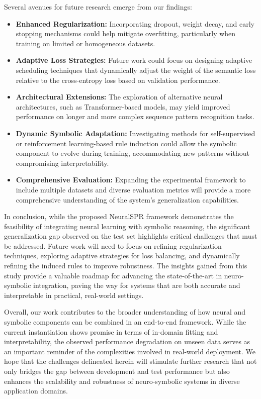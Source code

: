 \documentclass{article}
\begin{document}
Several avenues for future research emerge from our findings:
\begin{itemize}
    \item \textbf{Enhanced Regularization:} Incorporating dropout, weight decay, and early stopping mechanisms could help mitigate overfitting, particularly when training on limited or homogeneous datasets.
    \item \textbf{Adaptive Loss Strategies:} Future work could focus on designing adaptive scheduling techniques that dynamically adjust the weight of the semantic loss relative to the cross-entropy loss based on validation performance.
    \item \textbf{Architectural Extensions:} The exploration of alternative neural architectures, such as Transformer-based models, may yield improved performance on longer and more complex sequence pattern recognition tasks.
    \item \textbf{Dynamic Symbolic Adaptation:} Investigating methods for self-supervised or reinforcement learning-based rule induction could allow the symbolic component to evolve during training, accommodating new patterns without compromising interpretability.
    \item \textbf{Comprehensive Evaluation:} Expanding the experimental framework to include multiple datasets and diverse evaluation metrics will provide a more comprehensive understanding of the system’s generalization capabilities.
\end{itemize}

In conclusion, while the proposed NeuralSPR framework demonstrates the feasibility of integrating neural learning with symbolic reasoning, the significant generalization gap observed on the test set highlights critical challenges that must be addressed. Future work will need to focus on refining regularization techniques, exploring adaptive strategies for loss balancing, and dynamically refining the induced rules to improve robustness. The insights gained from this study provide a valuable roadmap for advancing the state-of-the-art in neuro-symbolic integration, paving the way for systems that are both accurate and interpretable in practical, real-world settings.
   
\vspace{1em}
Overall, our work contributes to the broader understanding of how neural and symbolic components can be combined in an end-to-end framework. While the current instantiation shows promise in terms of in-domain fitting and interpretability, the observed performance degradation on unseen data serves as an important reminder of the complexities involved in real-world deployment. We hope that the challenges delineated herein will stimulate further research that not only bridges the gap between development and test performance but also enhances the scalability and robustness of neuro-symbolic systems in diverse application domains.
\end{document}
